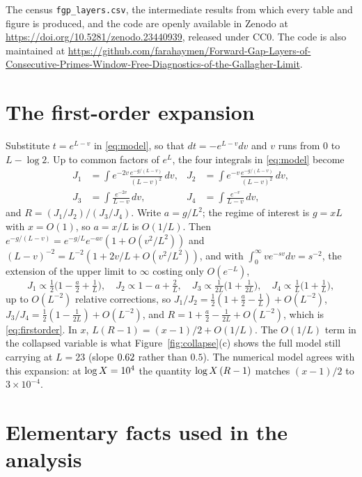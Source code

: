 \documentclass[11pt,a4paper]{article}
\begin{document}
The census \texttt{fgp\_layers.csv}, the intermediate results from which every table and figure is produced, and the code are openly available in Zenodo at \url{https://doi.org/10.5281/zenodo.23440939}, released under CC0. The code is also maintained at \url{https://github.com/farahaymen/Forward-Gap-Layers-of-Consecutive-Primes-Window-Free-Diagnostics-of-the-Gallagher-Limit}.




\appendix

\section{The first-order expansion}
\label{app:expansion}

Substitute $t=e^{L-v}$ in \eqref{eq:model}, so that $dt=-e^{L-v}dv$ and $v$ runs from $0$ to $L-\log2$. Up to common factors of $e^{L}$, the four integrals in \eqref{eq:model} become
\begin{align*}
J_1&=\int e^{-2v}\frac{e^{-g/(L-v)}}{(L-v)^2}\,dv, & J_2&=\int e^{-v}\frac{e^{-g/(L-v)}}{(L-v)^2}\,dv,\\
J_3&=\int\frac{e^{-2v}}{L-v}\,dv, & J_4&=\int\frac{e^{-v}}{L-v}\,dv,
\end{align*}
and $R=(J_1/J_2)/(J_3/J_4)$. Write $a=g/L^2$; the regime of interest is $g=xL$ with $x=O(1)$, so $a=x/L$ is $O(1/L)$. Then $e^{-g/(L-v)}=e^{-g/L}e^{-av}(1+O(v^2/L^2))$ and $(L-v)^{-2}=L^{-2}(1+2v/L+O(v^2/L^2))$, and with $\int_0^\infty v e^{-sv}dv=s^{-2}$, the extension of the upper limit to $\infty$ costing only $O(e^{-L})$,
\[
J_1\propto\tfrac12\bigl(1-\tfrac a2+\tfrac1L\bigr),\quad
J_2\propto 1-a+\tfrac2L,\quad
J_3\propto\tfrac1{2L}\bigl(1+\tfrac1{2L}\bigr),\quad
J_4\propto\tfrac1L\bigl(1+\tfrac1L\bigr),
\]
up to $O(L^{-2})$ relative corrections, so $J_1/J_2=\tfrac12(1+\tfrac a2-\tfrac1L)+O(L^{-2})$, $J_3/J_4=\tfrac12(1-\tfrac1{2L})+O(L^{-2})$, and $R=1+\tfrac a2-\tfrac1{2L}+O(L^{-2})$, which is \eqref{eq:firstorder}. In $x$, $L(R-1)=(x-1)/2+O(1/L)$. The $O(1/L)$ term in the collapsed variable is what Figure~\ref{fig:collapse}(c) shows the full model still carrying at $L=23$ (slope $0.62$ rather than $0.5$). The numerical model agrees with this expansion: at $\log X=10^{4}$ the quantity $\log X\,(R-1)$ matches $(x-1)/2$ to $3\times10^{-4}$.

\section{Elementary facts used in the analysis}
\label{app:lean}
\end{document}
